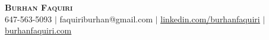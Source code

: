 \begin{center}
    \textbf{\Huge \scshape Burhan Faquiri} \\ \vspace{1pt}
    \small 647-563-5093 $|$ {faquiriburhan@gmail.com} $|$ 
    \href{https://www.linkedin.com/in/burhanfaquiri/}{\underline{linkedin.com/burhanfaquiri}} $|$
    \href{https://www.burhanfaquiri.com}{\underline{burhanfaquiri.com}}
\end{center}